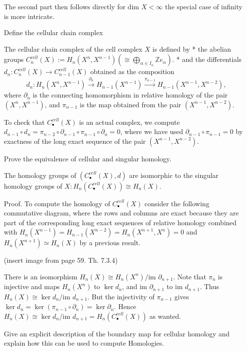 The second part then follows directly for \( \text{dim }X < \infty \) the special case of infinity is more intricate. 


Define the cellular chain complex

The cellular chain complex of the cell complex \(X\) is defined by 
* the abelian groups \(C^{cell}_n(X) := H_n(X^n, X^{n-1}) (\cong \bigoplus_{\alpha \in I_n} \mathbb{Z} e_\alpha)\).
* and the differentials \(d_n \colon C^{cell}_n(X) \to C^{cell}_{n-1}(X)\) obtained as the composition
\[ d_n \colon H_n(X^n, X^{n-1}) \xrightarrow{\partial_n} H_{n-1}(X^{n-1}) \xrightarrow{\pi_{n-1}} H_{n-1}(X^{n-1}, X^{n-2}), \]
where \(\partial_n\) is the connecting homomorphism in relative homology of the pair \((X^n, X^{n-1})\), and \(\pi_{n-1}\) 
is the map obtained from the pair \((X^{n-1}, X^{n-2})\).

To check that \(C^{cell}_\bullet(X)\) is an actual complex, we compute \(d_{n-1} \circ d_n = \pi_{n-2} \circ \partial_{n-1} \circ \pi_{n-1} \circ \partial_n = 0\), 
where we have used \(\partial_{n-1} \circ \pi_{n-1} = 0\) by exactness of the long exact sequence of the pair \((X^{n-1}, X^{n-2})\). 


Prove the equivalence of cellular and singular homology.

The homology groups of \((C^{cell}_\bullet(X), d)\) are isomorphic to the singular homology groups of \(X: H_n(C^{cell}_\bullet(X)) \cong H_n(X)\).

Proof. 
To compute the homology of \(C^{cell}_\bullet(X)\) consider the following commutative diagram, where the rows and columns are exact 
because they are part of the corresponding long exact sequences of relative homology combined with \( H_n(X^{n-1}) = H_{n-1}(X^{n-2}) = H_n(X^{n+1}, X^n) = 0 \)
and \( H_n(X^{n+1}) \simeq H_n(X) \) by a previous result.

(insert image from page 59. Th. 7.3.4)

There is an isomorphism \(H_n(X) \cong H_n(X^n) / \text{im } \partial_{n+1}\). 
Note that \(\pi_n\) is injective and maps \(H_n(X^n)\) to \(\ker d_n\), and \(\text{im } \partial_{n+1}\) to \(\text{im } d_{n+1}\). 
Thus \(H_n(X) \cong \ker d_n / \text{im } d_{n+1}\). But the injectivity of \(\pi_{n-1}\) gives \(\ker d_n = \ker (\pi_{n-1} \circ \partial_n) = \ker \partial_n\). 
Hence \(H_n(X) \cong \ker d_n / \text{im } d_{n+1} = H_n(C^{cell}_\bullet (X))\) as wanted.


Give an explicit description of the boundary map for cellular homology and explain how 
this can be used to compute Homologies.

